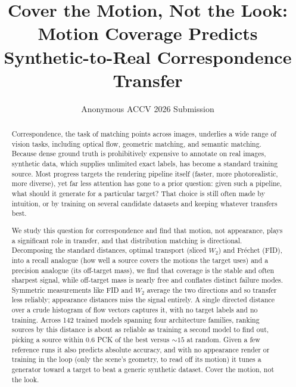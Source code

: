 \documentclass[runningheads]{llncs}
\newcommand{\pck}{PCK}
\begin{document}
\title{Cover the Motion, Not the Look: Motion Coverage Predicts
Synthetic-to-Real Correspondence Transfer}

\author{Anonymous ACCV 2026 Submission}

\maketitle

\begin{abstract}
    Correspondence, the task of matching points across images, underlies a wide range of vision tasks, including optical flow, geometric matching, and semantic matching. Because dense ground truth is prohibitively expensive to annotate on real images, synthetic data, which supplies unlimited exact labels, has become a standard training source. Most progress targets the rendering pipeline itself (faster, more photorealistic, more diverse), yet far less attention has gone to a prior question: given such a pipeline, what should it generate for a particular target? That choice is still often made by intuition, or by training on several candidate datasets and keeping whatever transfers best.

    We study this question for correspondence and find that motion, not appearance, plays a significant role in transfer, and that distribution matching is directional. Decomposing the standard distances, optimal transport (sliced $W_2$) and Fréchet (FID), into a recall analogue (how well a source covers the motions the target uses) and a precision analogue (its off-target mass), we find that coverage is the stable and often sharpest signal, while off-target mass is nearly free and conflates distinct failure modes. Symmetric measurements like FID and $W_2$ average the two directions and so transfer less reliably; appearance distances miss the signal entirely. A single directed distance over a crude histogram of flow vectors captures it, with no target labels and no training. Across 142 trained models spanning four architecture families, ranking sources by this distance is about as reliable as training a second model to find out, picking a source within $0.6$ \pck{} of the best versus ${\sim}15$ at random. Given a few reference runs it also predicts absolute accuracy, and with no appearance render or training in the loop (only the scene's geometry, to read off its motion) it tunes a generator toward a target to beat a generic synthetic dataset. Cover the motion, not the look.

\end{abstract}














\end{document}
